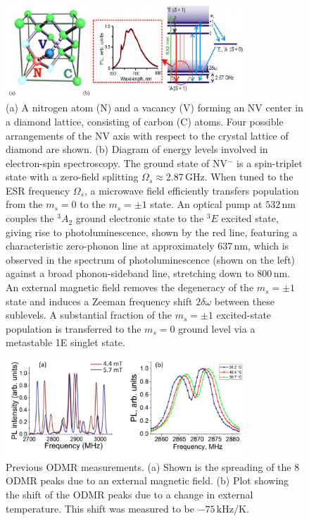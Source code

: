 \documentclass[11pt]{article}
\newcommand{\unit}[1]{\ensuremath{\, \mathrm{#1}}}
\begin{document}
\begin{figure}
\centering
\includegraphics[width=0.8\textwidth]{Figures/NVBackgroundFigure.png}
\caption{(a) A nitrogen atom (N) and a vacancy (V) forming an NV center in a diamond lattice, consisting of carbon
(C) atoms. Four possible arrangements of the NV axis with respect to the crystal lattice of diamond are shown. (b)
Diagram of energy levels involved in electron-spin spectroscopy. The ground state of NV$^-$ is a
spin-triplet state with a zero-field splitting $\Omega_s\approx2.87\unit{GHz}$. When tuned to the ESR frequency $\Omega_s$, a microwave
field efficiently transfers population from the $m_s = 0$ to the $m_s = \pm1$ state. An optical pump at $532\unit{nm}$ couples
the $^{3}A_{2}$ ground electronic state to the $^{3}E$ excited state, giving rise to photoluminescence, shown by the red line,
featuring a characteristic zero-phonon line at approximately $637\unit{nm}$, which is observed in the spectrum of
photoluminescence (shown on the left) against a broad phonon-sideband line, stretching down to $800\unit{nm}$. An
external magnetic field removes the degeneracy of the $m_s = \pm1$ state and induces a Zeeman frequency shift
$2\delta\omega$ between these
sublevels. A substantial fraction of the $m_s = \pm1$ excited-state population is transferred to the $m_s = 0$
ground level via a metastable 1E singlet state.}
\label{NVBackgroundFig}
\end{figure}

\begin{figure}
\centering
\includegraphics[width=0.8\textwidth]{Figures/TempMag.png}
\caption{Previous ODMR measurements. (a) Shown is the spreading of the 8 ODMR peaks due to an external magnetic field. (b) Plot showing the shift of the ODMR peaks due to a change in external temperature. This shift was measured to be $-75\unit{kHz/K}$.}
\label{TempMag}
\end{figure}
\end{document}
